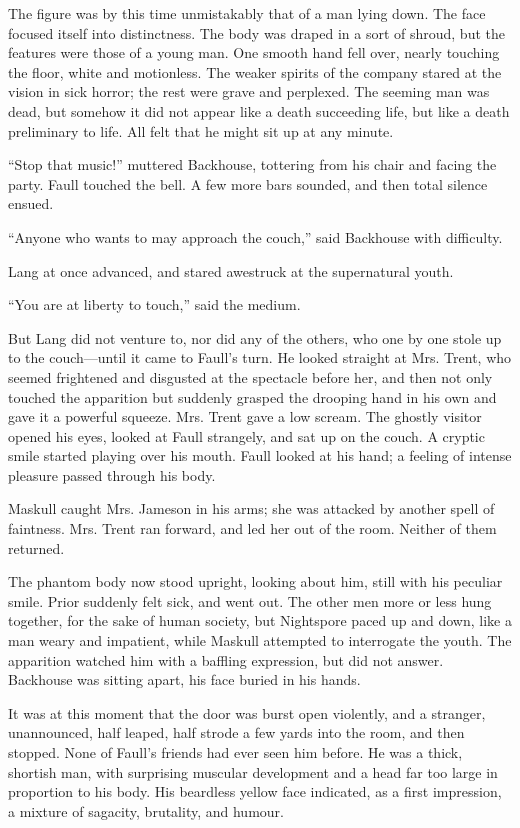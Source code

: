 The figure was by this time unmistakably that of a man lying down. The face focused itself into distinctness. The body was draped in a sort of shroud, but the features were those of a young man. One smooth hand fell over, nearly touching the floor, white and motionless. The weaker spirits of the company stared at the vision in sick horror; the rest were grave and perplexed. The seeming man was dead, but somehow it did not appear like a death succeeding life, but like a death preliminary to life. All felt that he might sit up at any minute.

``Stop that music!'' muttered Backhouse, tottering from his chair and facing the party. Faull touched the bell. A few more bars sounded, and then total silence ensued.

``Anyone who wants to may approach the couch,'' said Backhouse with difficulty.

Lang at once advanced, and stared awestruck at the supernatural youth.

``You are at liberty to touch,'' said the medium.

But Lang did not venture to, nor did any of the others, who one by one stole up to the couch—until it came to Faull's turn. He looked straight at Mrs. Trent, who seemed frightened and disgusted at the spectacle before her, and then not only touched the apparition but suddenly grasped the drooping hand in his own and gave it a powerful squeeze. Mrs. Trent gave a low scream. The ghostly visitor opened his eyes, looked at Faull strangely, and sat up on the couch. A cryptic smile started playing over his mouth. Faull looked at his hand; a feeling of intense pleasure passed through his body.

Maskull caught Mrs. Jameson in his arms; she was attacked by another spell of faintness. Mrs. Trent ran forward, and led her out of the room. Neither of them returned.

The phantom body now stood upright, looking about him, still with his peculiar smile. Prior suddenly felt sick, and went out. The other men more or less hung together, for the sake of human society, but Nightspore paced up and down, like a man weary and impatient, while Maskull attempted to interrogate the youth. The apparition watched him with a baffling expression, but did not answer. Backhouse was sitting apart, his face buried in his hands.

It was at this moment that the door was burst open violently, and a stranger, unannounced, half leaped, half strode a few yards into the room, and then stopped. None of Faull's friends had ever seen him before. He was a thick, shortish man, with surprising muscular development and a head far too large in proportion to his body. His beardless yellow face indicated, as a first impression, a mixture of sagacity, brutality, and humour.

